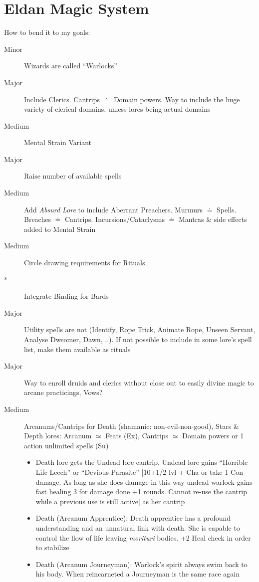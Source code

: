 \documentclass[10pt,a4paper]{article}
\begin{document}
\section{Eldan Magic System}
How to bend it to my goals:
\begin{description}
\item[Minor] Wizards are called ``Warlocks''
\item[Major] Include Clerics. Cantrips $\doteq$ Domain powers. Way to include the huge variety of clerical domains, unless lores being actual domains
\item[Medium] Mental Strain Variant
\item[Major] Raise number of available spells
\item[Medium] Add \textit{Absurd Lore} to include Aberrant Preachers. Murmurs $\doteq$ Spells. Breaches $\doteq$ Cantrips. Incursions/Cataclysms $\doteq$ Mantras \& side effects added to Mental Strain 
\item[Medium] Circle drawing requirements for Rituals
\item[*] Integrate Binding for Bards
\item[Major] Utility spells are not (Identify, Rope Trick, Animate Rope, Unseen Servant, Analyse Dweomer, Dawn, ..). If not possible to include in some lore's spell list, make them available as rituals
\item[Major] Way to enroll druids and clerics without close out to easily divine magic to arcane practicings, Vows?
\item[Medium] Arcanums/Cantrips for Death (shamanic: non-evil-non-good), Stars \& Depth lores: Arcanum $\simeq$ Feats (Ex), Cantrips $\simeq$ Domain powers or 1 action unlimited spells (Su)
	\begin{itemize}
	\item Death lore gets the Undead lore cantrip. Undead lore gains ``Horrible Life Leech'' or ``Devious Parasite'' [10+1/2 lvl + Cha or take 1 Con damage. As long as she does damage in this way undead warlock gains fast healing 3 for damage done +1 rounds. Cannot re-use the cantrip while a previous use is still active] as her cantrip 
	\item Death (Arcanum Apprentice): Death apprentice has a profound understanding and an unnatural link with death. She is capable to control the flow of life leaving \textit{morituri} bodies. +2 Heal check in order to stabilize 
	\item Death (Arcanum Journeyman): Warlock's spirit always swim back to his body. When reincarneted a Journeyman is the same race again

\end{itemize}
\end{description}
\end{document}
